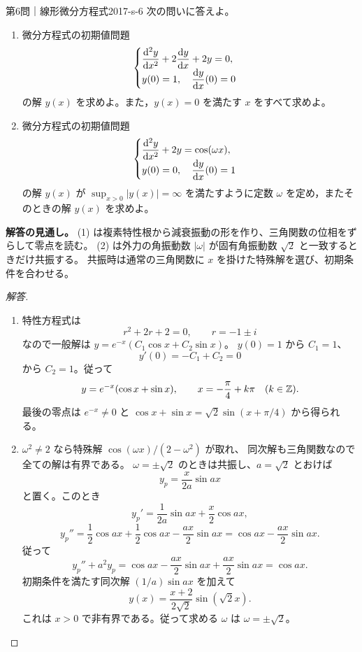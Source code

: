 \begin{problem}{第6問｜線形微分方程式}{2017-s-6}
次の問いに答えよ。
\begin{enumerate}
  \item[(1)] 微分方程式の初期値問題
  \[
  \begin{cases}
  \dfrac{\mathrm{d}^2y}{\mathrm{d} x^2}+2\dfrac{\mathrm{d} y}{\mathrm{d} x}+2y=0,\\[1mm]
  y(0)=1,\quad\dfrac{\mathrm{d} y}{\mathrm{d} x}(0)=0
  \end{cases}
  \]
  の解 $y(x)$ を求めよ。また，$y(x)=0$ を満たす $x$ をすべて求めよ。
  \item[(2)] 微分方程式の初期値問題
  \[
  \begin{cases}
  \dfrac{\mathrm{d}^2y}{\mathrm{d} x^2}+2y=\cos(\omega x),\\[1mm]
  y(0)=0,\quad\dfrac{\mathrm{d} y}{\mathrm{d} x}(0)=1
  \end{cases}
  \]
  の解 $y(x)$ が $\displaystyle\sup_{x>0}|y(x)|=\infty$ を満たすように定数 $\omega$ を定め，またそのときの解 $y(x)$ を求めよ。
\end{enumerate}
\end{problem}
\begin{memo*}
\textbf{解答の見通し。}
(1) は複素特性根から減衰振動の形を作り、三角関数の位相をずらして零点を読む。
(2) は外力の角振動数 $|\omega|$ が固有角振動数 $\sqrt2$ と一致するときだけ共振する。
共振時は通常の三角関数に $x$ を掛けた特殊解を選び、初期条件を合わせる。
\end{memo*}
\begin{proof}[解答]
\begin{enumerate}
\item[(1)] 特性方程式は
\[
r^2+2r+2=0,\qquad r=-1\pm i
\]
なので一般解は $y=e^{-x}(C_1\cos x+C_2\sin x)$。
$y(0)=1$ から $C_1=1$、
\[
y'(0)=-C_1+C_2=0
\]
から $C_2=1$。従って
\[
y=e^{-x}(\cos x+\sin x),\qquad x=-\frac\pi4+k\pi\quad(k\in\mathbb{Z}).
\]
最後の零点は $e^{-x}\ne0$ と
$\cos x+\sin x=\sqrt2\sin(x+\pi/4)$ から得られる。
\item[(2)] $\omega^2\ne2$ なら特殊解 $\cos(\omega x)/(2-\omega^2)$ が取れ、
同次解も三角関数なので全ての解は有界である。
$\omega=\pm\sqrt2$ のときは共振し、$a=\sqrt2$ とおけば
\[
y_p=\frac{x}{2a}\sin ax
\]
と置く。このとき
\[
y_p'=\frac1{2a}\sin ax+\frac x2\cos ax,
\]
\[
y_p''=\frac12\cos ax+\frac12\cos ax-\frac{ax}{2}\sin ax
=\cos ax-\frac{ax}{2}\sin ax.
\]
従って
\[
y_p''+a^2y_p
=\cos ax-\frac{ax}{2}\sin ax+\frac{ax}{2}\sin ax
=\cos ax.
\]
初期条件を満たす同次解 $(1/a)\sin ax$ を加えて
\[
y(x)=\frac{x+2}{2\sqrt2}\sin(\sqrt2x).
\]
これは $x>0$ で非有界である。従って求める $\omega$ は $\omega=\pm\sqrt2$。
\end{enumerate}
\end{proof}

